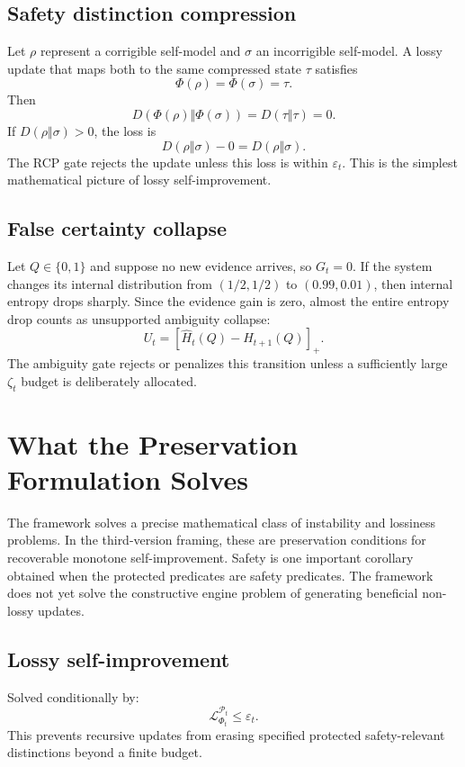 \documentclass[11pt]{article}
\newcommand{\Pcal}{\mathcal{P}}
\newcommand{\Lcal}{\mathcal{L}}
\newcommand{\1}{\mathbf{1}}
\newcommand{\eps}{\varepsilon}
\begin{document}
\subsection{Safety distinction compression}

Let \(\rho\) represent a corrigible self-model and \(\sigma\) an incorrigible self-model. A lossy update that maps both to the same compressed state \(\tau\) satisfies
\[
\Phi(\rho)=\Phi(\sigma)=\tau.
\]
Then
\[
D(\Phi(\rho)\Vert\Phi(\sigma))=D(\tau\Vert\tau)=0.
\]
If \(D(\rho\Vert\sigma)>0\), the loss is
\[
D(\rho\Vert\sigma)-0=D(\rho\Vert\sigma).
\]
The RCP gate rejects the update unless this loss is within \(\eps_t\). This is the simplest mathematical picture of lossy self-improvement.

\subsection{False certainty collapse}

Let \(Q\in\{0,1\}\) and suppose no new evidence arrives, so \(G_t=0\). If the system changes its internal distribution from \((1/2,1/2)\) to \((0.99,0.01)\), then internal entropy drops sharply. Since the evidence gain is zero, almost the entire entropy drop counts as unsupported ambiguity collapse:
\[
U_t=[\widehat H_t(Q)-\widehat H_{t+1}(Q)]_+.
\]
The ambiguity gate rejects or penalizes this transition unless a sufficiently large \(\zeta_t\) budget is deliberately allocated.

\section{What the Preservation Formulation Solves}

The framework solves a precise mathematical class of instability and lossiness problems. In the third-version framing, these are preservation conditions for recoverable monotone self-improvement. Safety is one important corollary obtained when the protected predicates are safety predicates. The framework does not yet solve the constructive engine problem of generating beneficial non-lossy updates.

\subsection{Lossy self-improvement}

Solved conditionally by:
\[
\Lcal^{\Pcal_t}_{\Phi_t}\le\eps_t.
\]
This prevents recursive updates from erasing specified protected safety-relevant distinctions beyond a finite budget.
\end{document}
